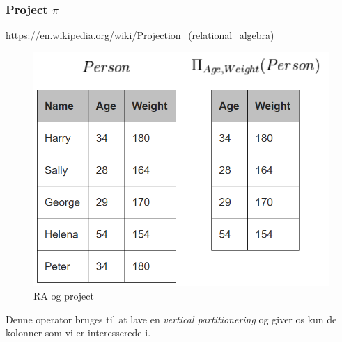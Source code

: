 \subsubsection{Project $\pi$}

\url{https://en.wikipedia.org/wiki/Projection_(relational_algebra)}\\

\begin{figure}[h]
	\centering
	\includegraphics[width=0.6\linewidth]{figs/spm6/project}
	\caption{RA og project}
	\label{fig:project}
\end{figure}


Denne operator bruges til at lave en \textit{vertical partitionering} og giver os kun de kolonner som vi er interesserede i. 
%
%
%
